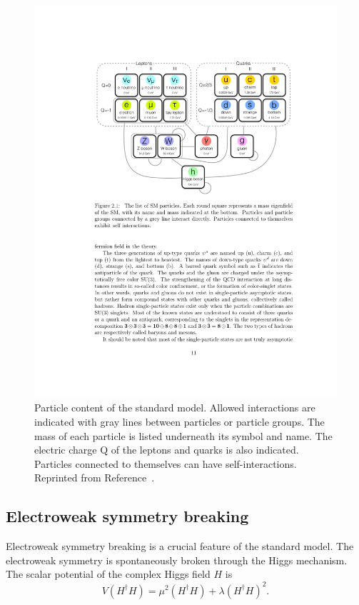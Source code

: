 \begin{figure}[htbp]
    \centering
    \includegraphics[width=\textwidth]{Figures/Theory/SM_Interactions.pdf}
    \caption{Particle content of the standard model. Allowed interactions are indicated with gray lines between particles or particle groups. The mass of each particle is listed underneath its symbol and name. The electric charge Q of the leptons and quarks is also indicated. Particles connected to themselves can have self-interactions.
    Reprinted from Reference~\cite{Yutaro}.}
    \label{fig:SMint}
\end{figure}


\subsection{Electroweak symmetry breaking}
\label{sec:EWSB}
Electroweak symmetry breaking is a crucial feature of the standard model. The electroweak symmetry is spontaneously broken through the Higgs mechanism. 
The scalar potential of the complex Higgs field $H$ is
\begin{equation}
V(H^\dagger H) =  \mu^2(H^\dagger H) + \lambda(H^\dagger H)^2. 
\label{equ:HiggsV}
\end{equation}

